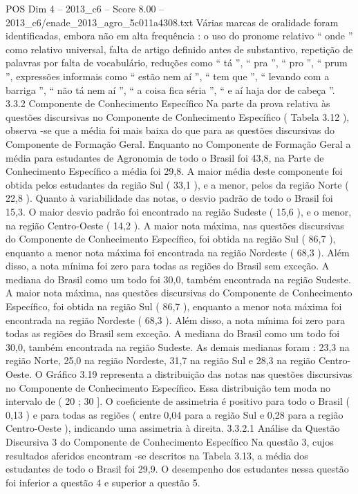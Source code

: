 \begin{textsample}{POS Dim 4 – 2013\_c6 – Score 8.00 – 2013\_c6/enade\_2013\_agro\_5c011a4308.txt}
Várias marcas de oralidade foram identificadas, embora não em alta frequência : o uso do pronome relativo “ onde ” como relativo universal, falta de artigo definido antes de substantivo, repetição de palavras por falta de vocabulário, reduções como “ tá ”, “ pra ”, “ pro ”, “ prum ”, expressões informais como “ estão nem aí ”, “ tem que ”, “ levando com a barriga ”, “ não tá nem aí ”, “ a coisa fica séria ”, “ e aí haja dor de cabeça ”. 3.3.2 Componente de Conhecimento Específico Na parte da prova relativa às questões discursivas no Componente de Conhecimento Específico ( Tabela 3.12 ), observa -se que a média foi mais baixa do que para as questões discursivas do Componente de Formação Geral.
Enquanto no Componente de Formação Geral a média para estudantes de Agronomia de todo o Brasil foi 43,8, na Parte de Conhecimento Específico a média foi 29,8.
A maior média deste componente foi obtida pelos estudantes da região Sul ( 33,1 ), e a menor, pelos da região Norte ( 22,8 ).
Quanto à variabilidade das notas, o desvio padrão de todo o Brasil foi 15,3.
O maior desvio padrão foi encontrado na região Sudeste ( 15,6 ), e o menor, na região Centro-Oeste ( 14,2 ).
A maior nota máxima, nas questões discursivas do Componente de Conhecimento Específico, foi obtida na região Sul ( 86,7 ), enquanto a menor nota máxima foi encontrada na região Nordeste ( 68,3 ).
Além disso, a nota mínima foi zero para todas as regiões do Brasil sem exceção.
A mediana do Brasil como um todo foi 30,0, também encontrada na região Sudeste.
A maior nota máxima, nas questões discursivas do Componente de Conhecimento Específico, foi obtida na região Sul ( 86,7 ), enquanto a menor nota máxima foi encontrada na região Nordeste ( 68,3 ).
Além disso, a nota mínima foi zero para todas as regiões do Brasil sem exceção.
A mediana do Brasil como um todo foi 30,0, também encontrada na região Sudeste.
As demais medianas foram : 23,3 na região Norte, 25,0 na região Nordeste, 31,7 na região Sul e 28,3 na região Centro-Oeste.
O Gráfico 3.19 representa a distribuição das notas nas questões discursivas no Componente de Conhecimento Específico.
Essa distribuição tem moda no intervalo de ( 20 ; 30 ].
O coeficiente de assimetria é positivo para todo o Brasil ( 0,13 ) e para todas as regiões ( entre 0,04 para a região Sul e 0,28 para a região Centro-Oeste ), indicando uma assimetria à direita. 3.3.2.1 Análise da Questão Discursiva 3 do Componente de Conhecimento Específico Na questão 3, cujos resultados aferidos encontram -se descritos na Tabela 3.13, a média dos estudantes de todo o Brasil foi 29,9.
O desempenho dos estudantes nessa questão foi inferior a questão 4 e superior a questão 5.

\end{textsample}
